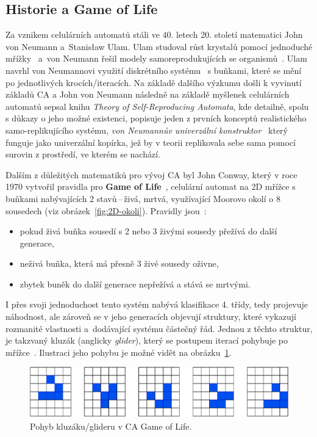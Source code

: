 \subsection*{Historie a Game of Life}
Za vznikem celulárních automatů stáli ve 40. letech 20. století matematici John von Neumann a~Stanisław Ulam. Ulam studoval růst krystalů pomocí jednoduché mřížky~\cite{pickover2009math} a~von Neumann řešil modely samoreprodukujících se organismů~\cite{history_CA}. Ulam navrhl von Neumannovi využití diskrétního systému~\cite{schiff2011cellular} s buňkami, které se mění po jednotlivých krocích/iteracích. Na základě dalšího výzkumu došli k vyvinutí základů CA a John von Neumann následně na základě myšlenek celulárních automatů sepsal knihu \textit{Theory of Self-Reproducing Automata}, kde detailně, spolu s důkazy o jeho možné existenci, popisuje jeden z prvních konceptů realistického samo-replikujícího systému, \textit{von Neumannův univerzální konstruktor}~\cite{theory_neumann} který funguje jako univerzální kopírka, jež by v teorii replikovala sebe sama pomocí surovin z prostředí, ve kterém se nachází. 

Dalším z důležitých matematiků pro vývoj CA byl John Conway, který v roce 1970 vytvořil pravidla pro \textbf{Game of Life}~\cite{history_CA}, celulární automat na 2D mřížce s buňkami nabývajících 2 stavů\,--\,živá, mrtvá, využívající Moorovo okolí o 8 sousedech (viz obrázek~\ref{fig:2D-okoli}). Pravidly jsou~\cite{Game_Of_Life}:
\begin{itemize}
    \item pokud živá buňka sousedí s 2 nebo 3 živými sousedy přežívá do další generace,
    \item neživá buňka, která má přesně 3 živé sousedy oživne,
    \item zbytek buněk do další generace nepřežívá a stává se mrtvými.
\end{itemize}
I přes svoji jednoduchost tento systém nabývá klasifikace 4. třídy, tedy projevuje náhodnost, ale zároveň se v jeho generacích objevují struktury, které vykazují rozmanité vlastnosti a~dodávající systému částečný řád. Jednou z těchto struktur, je takzvaný kluzák (anglicky \textit{glider}), který se postupem iterací pohybuje po mřížce~\cite{Game_Of_Life}. Ilustraci jeho pohybu je možné vidět na obrázku~\ref{fig:game_of_life}.
\begin{figure}[H]
    \centering
    \includegraphics[width=\textwidth]{obrazky-figures/ch2/GameOfLife.pdf}
    \caption{Pohyb kluzáku/glideru v CA Game of Life.}
    \label{fig:game_of_life}
\end{figure}

